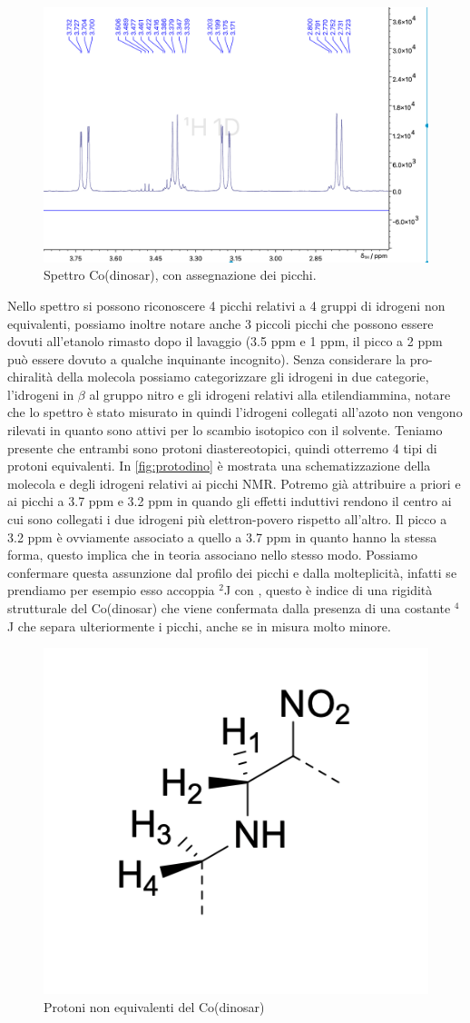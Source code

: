 \begin{figure}
    \centering
    \includegraphics[width=0.8\linewidth]{Relazione/foto/Dinosar_peak_calc.png}
    \caption{Spettro Co(dinosar), con assegnazione dei picchi.}
    \label{fig:dinosarpeakcalc}
\end{figure}
Nello spettro si possono riconoscere 4 picchi relativi a 4 gruppi di idrogeni non equivalenti, possiamo inoltre notare anche 3  piccoli picchi che possono essere dovuti all'etanolo rimasto dopo il lavaggio (3.5 ppm e 1 ppm, il picco a 2 ppm può essere dovuto a qualche inquinante incognito). Senza considerare la pro-chiralità della molecola possiamo categorizzare gli idrogeni in due categorie, l'idrogeni in $\beta$ al gruppo nitro e gli idrogeni relativi alla etilendiammina, notare che lo spettro è stato misurato in  quindi l'idrogeni collegati all'azoto non vengono rilevati in quanto sono attivi per lo scambio isotopico con il solvente. Teniamo presente che entrambi sono protoni diastereotopici, quindi otterremo  4 tipi di protoni equivalenti. In \autoref{fig:protodino} è mostrata una schematizzazione della molecola e degli idrogeni relativi ai picchi NMR. Potremo già attribuire a priori  e  ai picchi a 3.7 ppm e 3.2 ppm in quando gli effetti induttivi rendono il centro ai cui sono collegati i due idrogeni più elettron-povero rispetto all'altro. Il picco a 3.2 ppm è ovviamente associato a quello a 3.7 ppm in quanto hanno la stessa forma, questo implica che in teoria associano nello stesso modo. Possiamo confermare questa assunzione dal profilo dei picchi e dalla molteplicità, infatti se prendiamo per esempio  esso accoppia ${}^2$J con , questo è indice di una rigidità strutturale del Co(dinosar) che viene confermata dalla presenza di una costante ${}^4$J che separa ulteriormente i picchi, anche se in misura molto minore.
\begin{figure}[h!]
    \centering
    \includegraphics[width=0.3\linewidth]{Relazione/foto/protonidino.png}
    \caption{Protoni non equivalenti del Co(dinosar)}
    \label{fig:protodino}
\end{figure}


